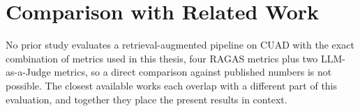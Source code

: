





\section{Comparison with Related Work}

No prior study evaluates a retrieval-augmented pipeline on CUAD with the exact combination of metrics used in this thesis, four RAGAS metrics plus two LLM-as-a-Judge metrics, so a direct comparison against published numbers is not possible. The closest available works each overlap with a different part of this evaluation, and together they place the present results in context.

